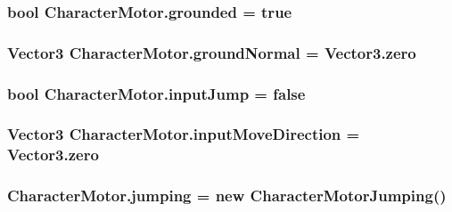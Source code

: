 \subsubsection[{grounded}]{\setlength{\rightskip}{0pt plus 5cm}bool Character\+Motor.\+grounded = true}\label{class_character_motor_a2515921b1c3156e2a4a15a7faf13a222}
\hypertarget{class_character_motor_a83cfb98714aa374ddef3692ccd8cba2c}{}
\subsubsection[{ground\+Normal}]{\setlength{\rightskip}{0pt plus 5cm}Vector3 Character\+Motor.\+ground\+Normal = Vector3.\+zero}\label{class_character_motor_a83cfb98714aa374ddef3692ccd8cba2c}
\hypertarget{class_character_motor_a35e7c3109338c4d66e8a0e3e8267eb1c}{}
\subsubsection[{input\+Jump}]{\setlength{\rightskip}{0pt plus 5cm}bool Character\+Motor.\+input\+Jump = false}\label{class_character_motor_a35e7c3109338c4d66e8a0e3e8267eb1c}
\hypertarget{class_character_motor_ad0bcb8698b03c87100f137eda3d44778}{}
\subsubsection[{input\+Move\+Direction}]{\setlength{\rightskip}{0pt plus 5cm}Vector3 Character\+Motor.\+input\+Move\+Direction = Vector3.\+zero}\label{class_character_motor_ad0bcb8698b03c87100f137eda3d44778}
\hypertarget{class_character_motor_ae37632c27e5831d2abebfaf6f3f1090d}{}
\subsubsection[{jumping}]{ Character\+Motor.\+jumping = new {\bf Character\+Motor\+Jumping}()}\label{class_character_motor_ae37632c27e5831d2abebfaf6f3f1090d}
\hypertarget{class_character_motor_a4e78119cee0a5fefef9e00fa3e3226e6}{}
